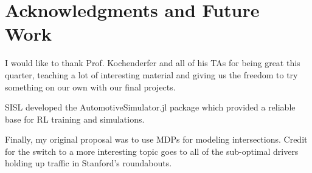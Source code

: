 \documentclass[conference]{IEEEtran}
\begin{document}
\section*{Acknowledgments and Future Work}
I would like to thank Prof. Kochenderfer and all of his TAs for being great this quarter, teaching a lot of interesting material and giving us the freedom to try something on our own with our final projects.

SISL developed the AutomotiveSimulator.jl package which provided a reliable base for RL training and simulations.

Finally, my original proposal was to use MDPs for modeling intersections. Credit for the switch to a more interesting topic goes to all of the sub-optimal drivers holding up traffic in Stanford's roundabouts.

%
%
%
\end{document}
